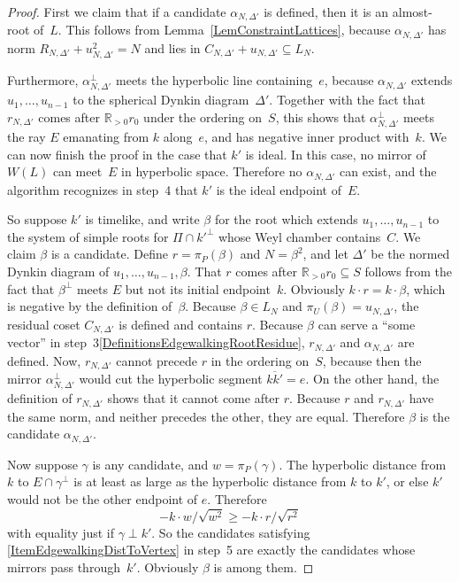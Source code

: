 \documentclass[12pt]{amsart}
\def\R{\mathbb{R}}
\def\sset{\subseteq}
\def\D{\Delta}
\numberwithin{theorem}{section}
\numberwithin{equation}{section}
\numberwithin{figure}{section}
\theoremstyle{remark}
\begin{document}
\begin{proof}
    First we claim that if a candidate
    $\alpha_{N,\D'}$ is defined,
    then it
    is an almost-root of~$L$.  This follows from Lemma~\ref{LemConstraintLattices},
    because $\alpha_{N,\D'}$ has norm $R_{N,\D'}+u_{N,\D'}^2=N$
    and lies in $C_{N,\D'}+u_{N,\D'}\sset L_N$.  

    Furthermore, $\alpha_{N,\D'}^\perp$ meets the
    hyperbolic line containing~$e$, because $\alpha_{N,\D'}$
    extends $u_1,\dots,u_{n-1}$ to the spherical Dynkin diagram~$\D'$.  
    Together with the fact that $r_{N,\D'}$ comes after $\R_{>0}r_0$ under
    the ordering on~$S$, this shows that $\alpha_{N,\D'}^\perp$
    meets the ray $E$ emanating from $k$ along~$e$, and has negative inner product
    with~$k$.
    We can now finish the proof in the case that $k'$ is ideal.  
    In this case, no mirror of $W(L)$ can meet~$E$ in
    hyperbolic space.
    Therefore no $\alpha_{N,\D'}$ can exist, and
    the algorithm recognizes in step~4 %
    that $k'$ is 
    the ideal endpoint of~$E$.

    So suppose $k'$ is timelike, and write $\beta$ for the root which
    extends $u_1,\dots,u_{n-1}$ to the system of simple roots for $\Pi\cap k'^\perp$
    whose Weyl chamber contains~$C$.  
    We claim $\beta$ is a candidate.
    Define $r=\pi_P(\beta)$ and $N=\beta^2$, and 
    let $\D'$
    be the normed Dynkin diagram of $u_1,\dots,u_{n-1},\beta$.  
    That $r$ comes after $\R_{>0} r_0\sset S$ follows from the fact that
    $\beta^\perp$ meets $E$ but not its initial endpoint~$k$.
    Obviously $k\cdot r=k\cdot\beta$, which is negative by the
    definition of~$\beta$.
    Because $\beta\in L_N$ and
    $\pi_U(\beta)=u_{N,\D'}$, the residual coset $C_{N,\D'}$ is defined
    and contains $r$.
    Because $\beta$ can serve a ``some vector'' in step~3\eqref{DefinitionsEdgewalkingRootResidue}, %
    $r_{N,\D'}$ and $\alpha_{N,\D'}$ are defined.  Now, $r_{N,\D'}$ cannot
    precede $r$ in the ordering on~$S$, because then the mirror
    $\alpha_{N,\D'}^\perp$ would
    cut the hyperbolic segment $\overline{kk'}=e$.  
    On the other hand,
    the definition of $r_{N,\D'}$ shows that it cannot come
    after $r$.  
    Because $r$ and $r_{N,\D'}$ have the same norm, and neither
    precedes the other, they are equal.
    Therefore $\beta$ is the
    candidate $\alpha_{N,\D'}$.

    Now suppose $\gamma$ is any candidate, and $w=\pi_P(\gamma)$.  
    The hyperbolic distance from $k$ to $E\cap\gamma^\perp$ is at
    least as large as the hyperbolic distance from $k$ to $k'$, or
    else $k'$ would not be the other endpoint of $e$.  Therefore
    $$
    -k\cdot w/\sqrt{w^2} \geq -k\cdot r/\sqrt{r^2}
    $$
    with equality just if $\gamma\perp k'$.  So the candidates satisfying
    \eqref{ItemEdgewalkingDistToVertex} in step~5 %
    are exactly the candidates whose mirrors
    pass through~$k'$.  Obviously $\beta$ is among them.


\end{proof}
\end{document}
